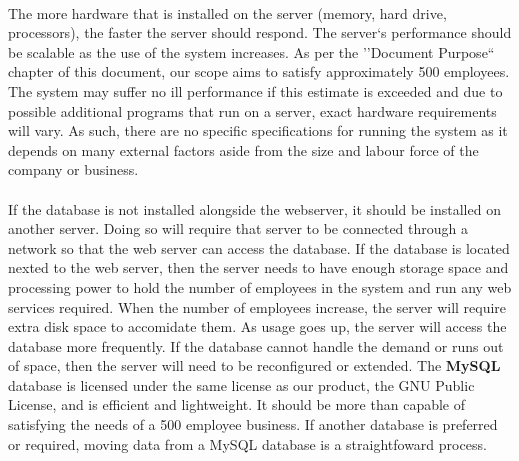 \documentclass[letterpaper,12pt]{report}
\begin{document}
\paragraph*{}\hspace{0.6cm}The more hardware that is installed on the server (memory, hard drive, processors), the faster the server should respond. The server`s performance should be scalable as the use of the system increases. As per the ''Document Purpose`` chapter of this document, our scope aims to satisfy approximately 500 employees. The system may suffer no ill performance if this estimate is exceeded and due to possible additional programs that run on a server, exact hardware requirements will vary. As such, there are no specific specifications for running the system as it depends on many external factors aside from the size and labour force of the company or business.
\paragraph*{}\hspace{0.6cm}If the database is not installed alongside the webserver, it should be installed on another server. Doing so will require that server to be connected through a network so that the web server can access the database. If the database is located nexted to the web server, then the server needs to have enough storage space and processing power to hold the number of employees in the system and run any web services required. When the number of employees increase, the server will require extra disk space to accomidate them. As usage goes up, the server will access the database more frequently. If the database cannot handle the demand or runs out of space, then the server will need to be reconfigured or extended. The \textbf{MySQL} database is licensed under the same license as our product, the GNU Public License, and is efficient and lightweight. It should be more than capable of satisfying the needs of a  500 employee business. If another database is preferred or required, moving data from a MySQL database is a straightfoward process.
\pagebreak
\end{document}
